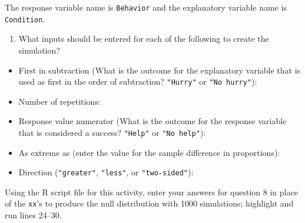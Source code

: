 \documentclass[
]{report}
\providecommand{\tightlist}{%
  \setlength{\itemsep}{0pt}\setlength{\parskip}{0pt}}
\begin{document}
The response variable name is \texttt{Behavior} and the explanatory variable name is \texttt{Condition}.

\begin{enumerate}
\def\labelenumi{\arabic{enumi}.}
\setcounter{enumi}{7}
\tightlist
\item
  What inputs should be entered for each of the following to create the simulation?
  \vspace{1mm}
\end{enumerate}

\begin{itemize}
\tightlist
\item
  First in subtraction (What is the outcome for the explanatory variable that is used as first in the order of subtraction? \texttt{"Hurry"} or \texttt{"No\ hurry"}):
\end{itemize}

\vspace{.15in}

\begin{itemize}
\tightlist
\item
  Number of repetitions:
\end{itemize}

\vspace{.15in}

\begin{itemize}
\tightlist
\item
  Response value numerator (What is the outcome for the response variable that is considered a success? \texttt{"Help"} or \texttt{"No\ help"}):
\end{itemize}

\vspace{.15in}

\begin{itemize}
\tightlist
\item
  As extreme as (enter the value for the sample difference in proportions):
\end{itemize}

\vspace{.15in}

\begin{itemize}
\tightlist
\item
  Direction (\texttt{"greater"}, \texttt{"less"}, or \texttt{"two-sided"}):
\end{itemize}

\vspace{.15in}

Using the R script file for this activity, enter your answers for question 8 in place of the \texttt{xx}'s to produce the null distribution with 1000 simulations; highlight and run lines 24--30.
\end{document}
